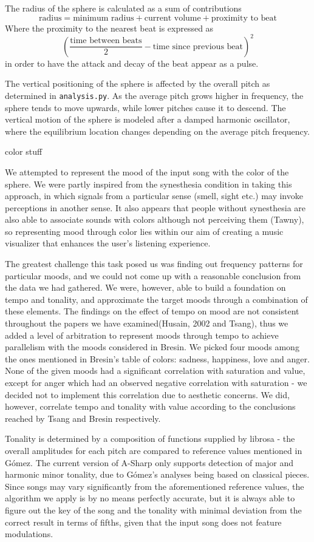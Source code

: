 \documentclass{article}
\newcommand{\code}{\texttt}
\begin{document}
The radius of the sphere is calculated as a sum of contributions
$$\text{radius} = \text{minimum radius} + \text{current volume} + \text{proximity to beat}$$
Where the proximity to the nearest beat is expressed as
$$\left( \frac{\text{time between beats}}{2} - \text{time since previous beat} \right)^2$$
in order to have the attack and decay of the beat appear as a pulse.

The vertical positioning of the sphere is affected by the overall pitch as determined in \code{analysis.py}. As the average pitch grows higher in frequency, the sphere tends to move upwards, while lower pitches cause it to descend. The vertical motion of the sphere is modeled after a damped harmonic oscillator, where the equilibrium location changes depending on the average pitch frequency.

color stuff

We attempted to represent the mood of the input song with the color of the sphere. We were partly inspired from the synesthesia condition in taking this approach, in which signals from a particular sense (smell, sight etc.) may invoke perceptions in another sense. It also appears that people without synesthesia are also able to associate sounds with colors although not perceiving them (Tawny), so representing mood through color lies within our aim of creating a music visualizer that enhances the user’s listening experience.

The greatest challenge this task posed us was finding out frequency patterns for particular moods, and we could not come up with a reasonable conclusion from the data we had gathered. We were, however, able to build a foundation on tempo and tonality, and approximate the target moods through a combination of these elements. The findings on the effect of tempo on mood are not consistent throughout the papers we have examined(Husain, 2002 and Tsang), thus we added a level of arbitration to represent moods through tempo to achieve parallelism with the moods considered in Bresin. We picked four moods among the ones mentioned in Bresin's table of colors: sadness, happiness, love and anger. None of the given moods had a significant correlation with saturation and value, except for anger which had an observed negative correlation with saturation - we decided not to implement this correlation due to aesthetic concerns. We did, however, correlate tempo and tonality with value according to the conclusions reached by Tsang and Bresin respectively.

Tonality is determined by a composition of functions supplied by librosa - the overall amplitudes for each pitch are compared to reference values mentioned in Gómez. The current version of A-Sharp only supports detection of major and harmonic minor tonality, due to Gómez's analyses being based on classical pieces. Since songs may vary significantly from the aforementioned reference values, the algorithm we apply is by no means perfectly accurate, but it is always able to figure out the key of the song and the tonality with minimal deviation from the correct result in terms of fifths, given that the input song does not feature modulations.
\end{document}
